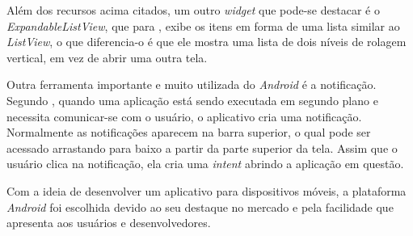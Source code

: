 	\par Além dos recursos acima citados, um outro \textit{widget} que pode-se
destacar é o \textit{ExpandableListView}, que para , exibe os
itens em forma de uma lista similar ao \textit{ListView}, o que
diferencia-o é que ele mostra uma lista de dois níveis de rolagem vertical, em
vez de abrir uma outra tela.

	\par Outra ferramenta importante e muito utilizada do \textit{Android} é a
notificação. Segundo , quando uma aplicação está
sendo executada em segundo plano e necessita comunicar-se com o usuário, o
aplicativo cria uma notificação. Normalmente as notificações aparecem na barra
superior, o qual pode ser acessado arrastando para baixo a partir da parte
superior da tela. Assim que o usuário clica na notificação, ela cria uma
\textit{intent} abrindo a aplicação em questão.

	\par Com a ideia de desenvolver um aplicativo para dispositivos móveis, a
plataforma \textit{Android} foi escolhida devido ao seu destaque no mercado e
pela facilidade que apresenta aos usuários e desenvolvedores.